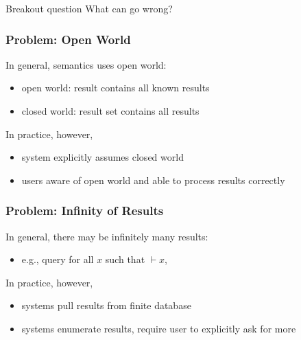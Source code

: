 \documentclass{beamer}
\renewcommand{\emph}[1]{\alert{#1}}
\begin{document}
\begin{frame}{Breakout question}
What can go wrong?
\end{frame}

\begin{frame}\frametitle{Problem: Open World}
In general, semantics uses open world:
\begin{itemize}
\item open world: result contains \emph{all known} results
\item closed world: result set contains \emph{all} results
\end{itemize}

In practice, however,
\begin{itemize}
\item system explicitly assumes closed world
\item users aware of open world and able to process results correctly
\end{itemize}
\end{frame}

\begin{frame}\frametitle{Problem: Infinity of Results}
In general, there may be infinitely many results:
\begin{itemize}
\item e.g., query for all $x$ such that $\vdash x$,
\end{itemize}

In practice, however,
\begin{itemize}
\item systems pull results from finite database 
\item systems enumerate results, require user to explicitly ask for more 
\end{itemize}
\end{frame}
\end{document}
